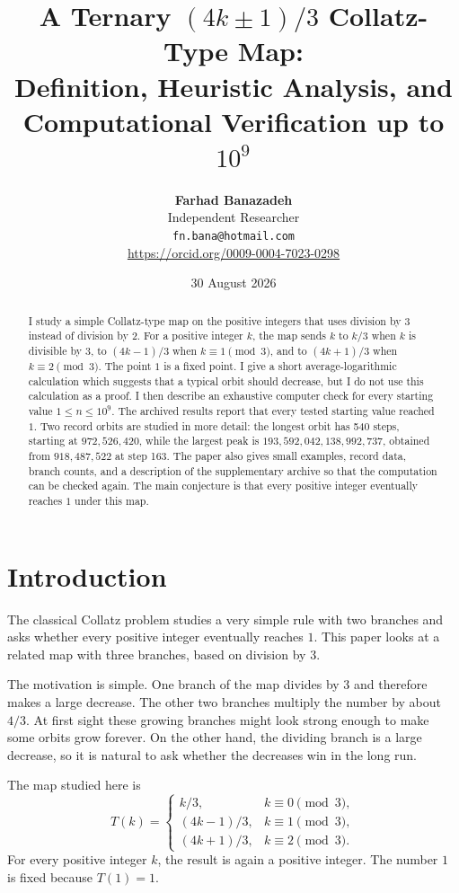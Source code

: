 \documentclass[11pt]{article}
\title{A Ternary $(4k\pm1)/3$ Collatz-Type Map:\\Definition, Heuristic Analysis, and Computational Verification up to $10^9$}
\author{\textbf{Farhad Banazadeh}\\Independent Researcher\\[2pt]\texttt{fn.bana@hotmail.com}\\\url{https://orcid.org/0009-0004-7023-0298}}
\date{30 August 2026}
\begin{document}
\maketitle

\begin{abstract}
I study a simple Collatz-type map on the positive integers that uses division by 3 instead of division by 2. For a positive integer $k$, the map sends $k$ to $k/3$ when $k$ is divisible by 3, to $(4k-1)/3$ when $k\equiv1\pmod 3$, and to $(4k+1)/3$ when $k\equiv2\pmod 3$. The point $1$ is a fixed point. I give a short average-logarithmic calculation which suggests that a typical orbit should decrease, but I do not use this calculation as a proof. I then describe an exhaustive computer check for every starting value $1\le n\le10^9$. The archived results report that every tested starting value reached $1$. Two record orbits are studied in more detail: the longest orbit has 540 steps, starting at $972,526,420$, while the largest peak is $193,592,042,138,992,737$, obtained from $918,487,522$ at step 163. The paper also gives small examples, record data, branch counts, and a description of the supplementary archive so that the computation can be checked again. The main conjecture is that every positive integer eventually reaches $1$ under this map.
\end{abstract}

\section{Introduction}
The classical Collatz problem studies a very simple rule with two branches and asks whether every positive integer eventually reaches $1$. This paper looks at a related map with three branches, based on division by 3.

The motivation is simple. One branch of the map divides by 3 and therefore makes a large decrease. The other two branches multiply the number by about $4/3$. At first sight these growing branches might look strong enough to make some orbits grow forever. On the other hand, the dividing branch is a large decrease, so it is natural to ask whether the decreases win in the long run.

The map studied here is
\[
T(k)=
\begin{cases}
 k/3, & k\equiv0\pmod3,\\
 (4k-1)/3, & k\equiv1\pmod3,\\
 (4k+1)/3, & k\equiv2\pmod3.
\end{cases}
\]
For every positive integer $k$, the result is again a positive integer. The number $1$ is fixed because $T(1)=1$.
\end{document}
